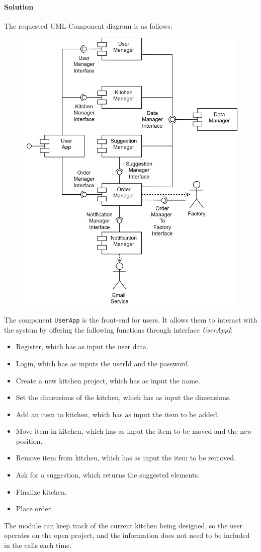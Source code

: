 \paragraph*{Solution}
The requested UML Component diagram is as follows: 
\begin{figure}[H]
    \centering
    \includegraphics[width=0.4\linewidth]{images/cd.png}
\end{figure}

The component \texttt{UserApp} is the front-end for users. 
It allows them to interact with the system by offering the following functions through interface \textit{UserAppI}:
\begin{itemize}
    \item Register, which has as input the user data. 
    \item Login, which has as inputs the userId and the password.
    \item Create a new kitchen project, which has as input the name. 
    \item Set the dimensions of the kitchen, which has as input the dimensions.
    \item Add an item to kitchen, which has as input the item to be added.
    \item Move item in kitchen, which has as input the item to be moved and the new position.
    \item Remove item from kitchen, which has as input the item to be removed.
    \item Ask for a suggestion, which returns the suggested elements.
    \item Finalize kitchen.
    \item Place order.
\end{itemize}
The module can keep track of the current kitchen being designed, so the user operates on the open project, and the information does not need to be included in the calls each time.


